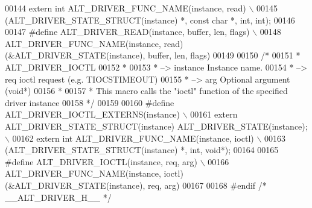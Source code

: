 \begin{DoxyCode}
00144 \textcolor{preprocessor}{    extern int ALT\_DRIVER\_FUNC\_NAME(instance, read)                         \(\backslash\)}
00145 \textcolor{preprocessor}{      (ALT\_DRIVER\_STATE\_STRUCT(instance) *, const char *, int, int);}
00146 
00147 \textcolor{preprocessor}{#define ALT\_DRIVER\_READ(instance, buffer, len, flags)                       \(\backslash\)}
00148 \textcolor{preprocessor}{    ALT\_DRIVER\_FUNC\_NAME(instance, read)(&ALT\_DRIVER\_STATE(instance), buffer, len, flags)}
00149 
00150 \textcolor{comment}{/*}
00151 \textcolor{comment}{ * ALT\_DRIVER\_IOCTL}
00152 \textcolor{comment}{ *}
00153 \textcolor{comment}{ *   --> instance               Instance name.}
00154 \textcolor{comment}{ *   --> req                    ioctl request (e.g. TIOCSTIMEOUT)}
00155 \textcolor{comment}{ *   --> arg                    Optional argument (void*)}
00156 \textcolor{comment}{ *}
00157 \textcolor{comment}{ * This macro calls the "ioctl" function of the specified driver instance}
00158 \textcolor{comment}{ */}
00159 
00160 \textcolor{preprocessor}{#define ALT\_DRIVER\_IOCTL\_EXTERNS(instance)                                  \(\backslash\)}
00161 \textcolor{preprocessor}{    extern ALT\_DRIVER\_STATE\_STRUCT(instance) ALT\_DRIVER\_STATE(instance);    \(\backslash\)}
00162 \textcolor{preprocessor}{    extern int ALT\_DRIVER\_FUNC\_NAME(instance, ioctl)                        \(\backslash\)}
00163 \textcolor{preprocessor}{      (ALT\_DRIVER\_STATE\_STRUCT(instance) *, int, void*);}
00164 
00165 \textcolor{preprocessor}{#define ALT\_DRIVER\_IOCTL(instance, req, arg)                                \(\backslash\)}
00166 \textcolor{preprocessor}{    ALT\_DRIVER\_FUNC\_NAME(instance, ioctl)(&ALT\_DRIVER\_STATE(instance), req, arg)}
00167 
00168 \textcolor{preprocessor}{#endif }\textcolor{comment}{/* \_\_ALT\_DRIVER\_H\_\_ */}\textcolor{preprocessor}{}
\end{DoxyCode}
